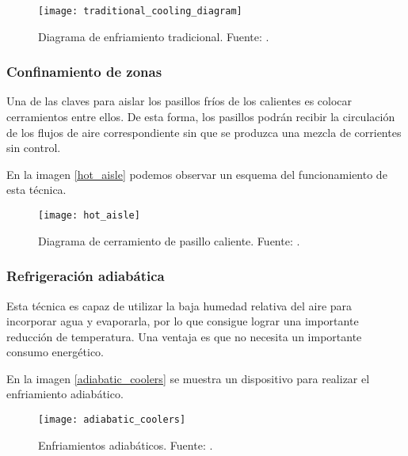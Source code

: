 \begin{figure}
    \begin{center}
        \texttt{[image: traditional\_cooling\_diagram]}
        \caption{Diagrama de enfriamiento tradicional. Fuente: \cite{journal-uptimeinstitute}.}
        \label{traditional_cooling}
    \end{center}
\end{figure}

\subsubsection{Confinamiento de zonas}

Una de las claves para aislar los pasillos fríos de los calientes es colocar cerramientos entre ellos. De esta forma, los pasillos podrán recibir la circulación de los flujos de aire correspondiente sin que se produzca una mezcla de corrientes sin control.

En la imagen \eqref{hot_aisle} podemos observar un esquema del funcionamiento de esta técnica.

\begin{figure}
    \begin{center}
        \texttt{[image: hot\_aisle]}
        \caption{Diagrama de cerramiento de pasillo caliente. Fuente: \cite{journal-uptimeinstitute}.}
        \label{hot_aisle}
    \end{center}
\end{figure}

\subsubsection{Refrigeración adiabática}

Esta técnica es capaz de utilizar la baja humedad relativa del aire para incorporar agua y evaporarla, por lo que consigue lograr una importante reducción de temperatura. Una ventaja es que no necesita un importante consumo energético.

En la imagen \eqref{adiabatic_coolers} se muestra un dispositivo para realizar el enfriamiento adiabático.

\begin{figure}
    \begin{center}
        \texttt{[image: adiabatic\_coolers]}
        \caption{Enfriamientos adiabáticos. Fuente: \cite{Kelvion}.}
        \label{adiabatic_coolers}
    \end{center}
\end{figure}

